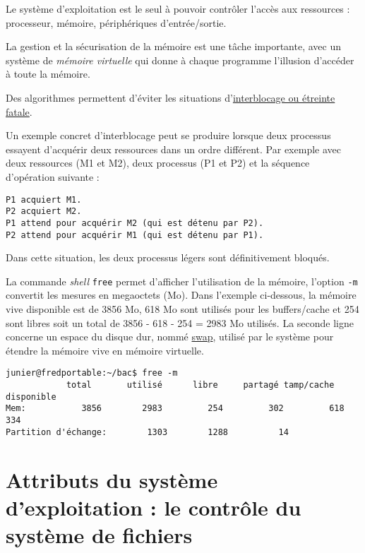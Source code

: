 \documentclass[
  11pt,
]{article}
\newcounter{thme}
\newcounter{alg}
\newcounter{prog}
\begin{document}
Le système d'exploitation est le seul à pouvoir contrôler l'accès aux
ressources : processeur, mémoire, périphériques d'entrée/sortie.

La gestion et la sécurisation de la mémoire est une tâche importante,
avec un système de \emph{mémoire virtuelle} qui donne à chaque programme
l'illusion d'accéder à toute la mémoire.

Des algorithmes permettent d'éviter les situations
d'\href{https://fr.wikipedia.org/wiki/Interblocage}{interblocage ou
étreinte fatale}.

Un exemple concret d'interblocage peut se produire lorsque deux
processus essayent d'acquérir deux ressources dans un ordre différent.
Par exemple avec deux ressources (M1 et M2), deux processus (P1 et P2)
et la séquence d'opération suivante :

\begin{verbatim}
P1 acquiert M1.
P2 acquiert M2.
P1 attend pour acquérir M2 (qui est détenu par P2).
P2 attend pour acquérir M1 (qui est détenu par P1).
\end{verbatim}

Dans cette situation, les deux processus légers sont définitivement
bloqués.

La commande \emph{shell} \texttt{free} permet d'afficher l'utilisation
de la mémoire, l'option \texttt{-m} convertit les mesures en megaoctets
(Mo). Dans l'exemple ci-dessous, la mémoire vive disponible est de 3856
Mo, 618 Mo sont utilisés pour les buffers/cache et 254 sont libres soit
un total de 3856 - 618 - 254 = 2983 Mo utilisés. La seconde ligne
concerne un espace du disque dur, nommé
\href{https://doc.ubuntu-fr.org/swap}{swap}, utilisé par le système pour
étendre la mémoire vive en mémoire virtuelle.

\begin{verbatim}
junier@fredportable:~/bac$ free -m
            total       utilisé      libre     partagé tamp/cache   disponible
Mem:           3856        2983         254         302         618         334
Partition d'échange:        1303        1288          14
\end{verbatim}

\hypertarget{attributs-du-systuxe8me-dexploitation-le-contruxf4le-du-systuxe8me-de-fichiers}{%
\section{Attributs du système d'exploitation : le contrôle du système de
fichiers}\label{attributs-du-systuxe8me-dexploitation-le-contruxf4le-du-systuxe8me-de-fichiers}}
\end{document}
